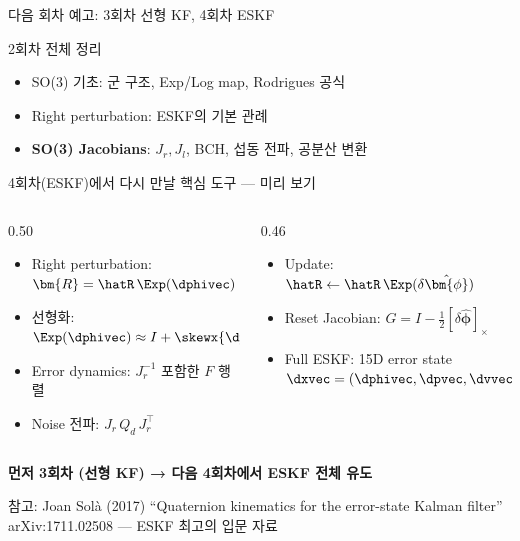 \begin{frame}{다음 회차 예고: 3회차 선형 KF, 4회차 ESKF}
  \begin{block}{2회차 전체 정리}
    \begin{itemize}
      \item SO(3) 기초: 군 구조, Exp/Log map, Rodrigues 공식
      \item Right perturbation: ESKF의 기본 관례
      \item \textbf{SO(3) Jacobians}: $J_r, J_l$, BCH, 섭동 전파, 공분산 변환
    \end{itemize}
  \end{block}
  \pause
  \begin{alertblock}{4회차(ESKF)에서 다시 만날 핵심 도구 — 미리 보기}
    \begin{columns}[T]
      \begin{column}{0.50\textwidth}
        \begin{itemize}
          \item Right perturbation: $\bm{R} = \hatR\,\Exp(\dphivec)$
          \item 선형화: $\Exp(\dphivec) \approx I + \skewx{\dphivec}$
          \item Error dynamics: $J_r^{-1}$ 포함한 $F$ 행렬
          \item Noise 전파: $J_r\,Q_d\,J_r^\top$
        \end{itemize}
      \end{column}
      \begin{column}{0.46\textwidth}
        \begin{itemize}
          \item Update: $\hatR \leftarrow \hatR\,\Exp(\delta\hat{\bm{\phi}})$
          \item Reset Jacobian: $G = I - \tfrac{1}{2}[\delta\hat{\bm{\phi}}]_\times$
          \item Full ESKF: 15D error state\\
                $\dxvec = (\dphivec, \dpvec, \dvvec, \dbgvec, \dbavec)^\top$
        \end{itemize}
      \end{column}
    \end{columns}
  \end{alertblock}
  \pause
  \begin{center}
    \large\textbf{먼저 3회차 (선형 KF) → 다음 4회차에서 ESKF 전체 유도}
  \end{center}
  \begin{center}
    \small 참고: Joan Solà (2017) ``Quaternion kinematics for the error-state Kalman filter''\\
    arXiv:1711.02508 --- ESKF 최고의 입문 자료
  \end{center}
\end{frame}

